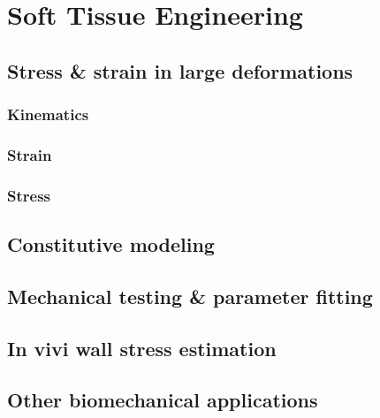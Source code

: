 \documentclass[../main.tex]{subfiles}
\begin{document}
\chapter{Soft Tissue Engineering}

\section{Stress \& strain in large deformations}

\subsection{Kinematics}
\subsection{Strain}
\subsection{Stress}

\section{Constitutive modeling}

\section{Mechanical testing \& parameter fitting}

\section{In vivi wall stress estimation}

\section{Other biomechanical applications}
\end{document}
